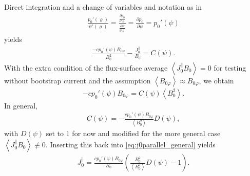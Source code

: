 \documentclass[a4paper, twoside, 10pt, english]{article}
\numberwithin{equation}{section}
\let\temp\varrho
\let\varrho\rho
\let\rho\temp
\let\temp\vartheta
\let\vartheta\theta
\let\theta\temp
\let\temp\varphi
\let\varphi\phi
\let\phi\temp
\newcommand*\pd[2][]{\ensuremath{\frac{\partial #1}{\partial #2}}}  %
\begin{document}
Direct integration and a change of variables and notation as in
\begin{gather}
  \frac{p_{0}'(\rho)}{\psi'(\rho)} = \frac{\pd[p_{0}]{\rho}}{\pd[\psi]{\rho}} = \pd[p_{0}]{\psi} = p_{0}'(\psi)
\end{gather}
yields
\begin{gather}
  \frac{-c p_{0}' (\psi) B_{0 \phi}}{B_{0}^{2}} - \frac{J_{0}^{\parallel}}{B_{0}} = C(\psi). \label{eq:j0parallel_general}
\end{gather}
With the extra condition of the flux-surface average $\left\langle J_{0}^{\parallel} B_{0} \right\rangle = 0$ for testing without bootstrap current and the assumption $\left\langle B_{0 \phi} \right\rangle \approx B_{0 \phi}$, we obtain
\begin{gather}
  -c p_{0}'(\psi) B_{0 \phi} = C(\psi) \left\langle B_{0}^{2} \right\rangle.
\end{gather}
In general, 
\begin{gather}
  C(\psi) = -\frac{c p_{0}'(\psi) B_{0 \phi}}{\left\langle B_{0}^{2} \right\rangle} D(\psi),
\end{gather}
with $D(\psi)$ set to 1 for now and modified for the more general case $\left\langle J_{0}^{\parallel} B_{0} \right\rangle \not\equiv 0$. Inserting this back into \cref{eq:j0parallel_general} yields
\begin{gather}
  J_{0}^{\parallel} = \frac{c p_{0}'(\psi) B_{0 \phi}}{B_{0}} \left( \frac{B_{0}^{2}}{\left\langle B_{0}^{2} \right\rangle} D(\psi) - 1 \right).
\end{gather}
\end{document}
